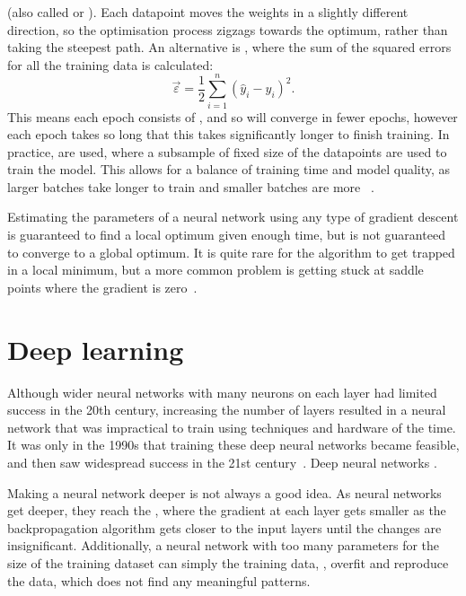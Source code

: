   (also called  or ).
Each datapoint moves the weights in a slightly different direction, so the optimisation process zigzags towards the optimum, rather than taking the steepest path.
An alternative is , where the sum of the squared errors for all the training data is calculated:
\[ \vec{\varepsilon} = \frac{1}{2} \sum_{i = 1}^{n}\left(\hat{y}_i - y_i\right)^2. \]
This means each epoch consists of , and so will converge in fewer epochs, however each epoch takes so long that this takes significantly longer to finish training.
In practice,  are used, where a subsample of fixed size of the datapoints are used to train the model.
This allows for a balance of training time and model quality, as larger batches take longer to train and smaller batches are more ~\autocite[59]{thoma2017}.

Estimating the parameters of a neural network using any type of gradient descent is guaranteed to find a local optimum given enough time, but is not guaranteed to converge to a global optimum.
It is quite rare for the algorithm to get trapped in a local minimum, but a more common problem is getting stuck at saddle points where the gradient is zero~\autocite[438]{lecun2015}.

\section{Deep learning} \label{sec:deep-learning}

Although wider neural networks with many neurons on each layer had limited success in the 20th century, increasing the number of layers resulted in a neural network that was impractical to train using techniques and hardware of the time.
It was only in the 1990s that training these deep neural networks became feasible, and then saw widespread success in the 21st century~\autocite[86]{schmidhuber2015}.
Deep neural networks .

Making a neural network deeper is not always a good idea.
As neural networks get deeper, they reach the , where the gradient at each layer gets smaller as the backpropagation algorithm gets closer to the input layers until the changes are insignificant.
Additionally, a neural network with too many parameters for the size of the training dataset can simply  the training data, \ie{}, overfit and reproduce the data, which does not find any meaningful patterns.

